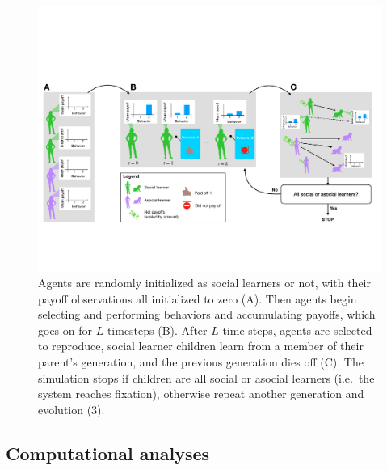 \documentclass[letterpaper,11.5pt]{scrartcl}
\begin{document}
\begin{figure}
  \caption{Agents are randomly initialized as social learners or not, with their
  payoff observations all initialized to zero (A). Then agents begin selecting
and performing behaviors and accumulating payoffs, which goes on for $L$
timesteps (B). After $L$ time steps, agents are selected to reproduce,
social learner children learn from a member of their parent's generation, and
the previous generation dies off (C). The simulation stops if children are all
social or asocial learners (i.e.\ the system reaches fixation), 
otherwise repeat another generation and evolution (3).}
  \label{fig:schematic}
  \centering
    \includegraphics[width=\textwidth]{Figures/IntraInterGenerationalDynamics.pdf}
\end{figure}


\subsection{Computational analyses}
\label{ssec:computationalAnalyses}

\end{document}
